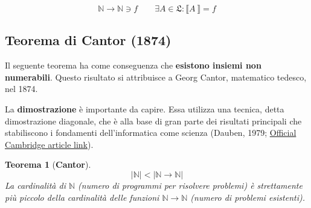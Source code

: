 \documentclass[a4paper]{article}
\newtheorem{theorem}{Teorema}
\newcommand{\exec}[1]{\llbracket #1\:\rrbracket}
\begin{document}
	\begin{equation*}
		\mathbb{N} \longrightarrow \mathbb{N} \ni f \hspace{2em}
		\exists A \in \mathfrak{L} : \exec{A} = f
	\end{equation*}
	
	\newpage
	
	\subsection{Teorema di Cantor (1874)}
	
	Il seguente teorema ha come conseguenza che \textbf{esistono insiemi non numerabili}. Questo risultato si attribuisce a Georg Cantor, matematico tedesco, nel 1874.
	
	La \textbf{dimostrazione} è importante da capire. Essa utilizza una tecnica, detta dimostrazione diagonale, che è alla base di gran parte dei risultati principali che stabiliscono i fondamenti dell'informatica come scienza (Dauben, 1979; \href{https://www.cambridge.org/core/journals/journal-of-symbolic-logic/article/abs/joseph-warren-dauben-georg-cantor-his-mathematics-and-philosophy-of-the-infinite-harvard-university-press-cambridge-mass-and-london-1979-ix-404-pp/52B6E0EDBF207D9023F9526866CDF92D}{Official Cambridge article link}).
	
	\begin{theorem}[\textbf{Cantor}] \label{cantor}
		\begin{equation}
			|\mathbb{N}| < |\mathbb{N} \longrightarrow \mathbb{N}|
		\end{equation}
		La cardinalità di $\mathbb{N}$ (numero di programmi per risolvere problemi) è strettamente più piccolo della cardinalità delle funzioni $\mathbb{N} \longrightarrow \mathbb{N}$ (numero di problemi esistenti).
	\end{theorem}
\end{document}
